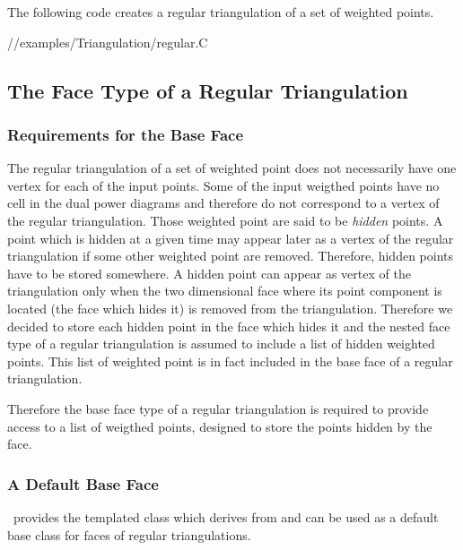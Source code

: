 


\ccExample
The following code  creates a regular triangulation 
of a set of weighted points.

//examples/Triangulation/regular.C


\subsection{The Face Type of a Regular Triangulation}

\subsubsection{Requirements for the Base Face}
The regular triangulation of a set of weighted point does not
necessarily
have one vertex for each of the input points. Some of the input
weigthed points have no cell in the dual power diagrams
and therefore do not correspond to a vertex of the regular
triangulation.
Those weighted point are said to be {\it hidden} points.
A  point which is hidden at a given time may appear later as a vertex of
the regular triangulation if some other weighted point are removed.
Therefore, hidden points have to be stored somewhere.
A hidden point can appear as vertex of the triangulation
only when the
two dimensional face where its point component is located
(the face which hides it)
is removed from the triangulation. 
Therefore we decided to store each hidden point
in the face which  hides it and the nested face type of a 
regular triangulation is assumed to include a list of hidden 
weighted points. This list of weighted point is in fact included
in the base face of a regular triangulation.

Therefore the base face type of a regular triangulation
is required to provide access to a list of weigthed points,
designed to store the points hidden by the face.


\subsubsection{A Default Base Face}
\cgal\ provides the templated class 
which derives from 
and can be used as a default base class for faces of regular triangulations.



